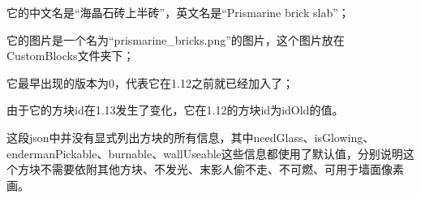 \documentclass[UTF8]{ctexart}
\begin{document}
    它的中文名是“海晶石砖上半砖”，英文名是“Prismarine brick slab”；
    
    它的图片是一个名为“prismarine\_bricks.png”的图片，这个图片放在CustomBlocks文件夹下；
    
    它最早出现的版本为0，代表它在1.12之前就已经加入了；
    
    由于它的方块id在1.13发生了变化，它在1.12的方块id为idOld的值。
    

    这段json中并没有显式列出方块的所有信息，其中needGlass、isGlowing、endermanPickable、burnable、wallUseable这些信息都使用了默认值，分别说明这个方块不需要依附其他方块、不发光、末影人偷不走、不可燃、可用于墙面像素画。
\end{document}
